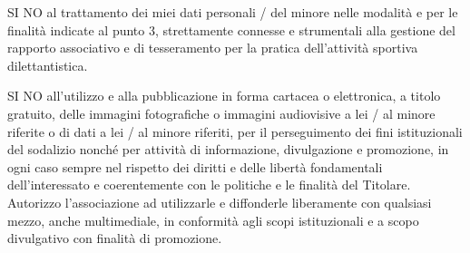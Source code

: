 \documentclass{djtsmod}
\begin{document}
	\squarelabel\; SI \quad \squarelabel\; NO \quad al trattamento dei miei dati personali / del minore nelle modalità e per le finalità indicate al punto 3, strettamente connesse e strumentali alla gestione del rapporto associativo e di tesseramento per la pratica dell'attività sportiva dilettantistica.
	
	\squarelabel\; SI \quad \squarelabel\; NO \quad all'utilizzo e alla pubblicazione in forma cartacea o elettronica, a titolo gratuito, delle immagini fotografiche o immagini audiovisive a lei / al minore riferite o di dati a lei / al minore riferiti, per il perseguimento dei fini istituzionali del sodalizio nonché per attività di informazione, divulgazione e promozione, in ogni caso sempre nel rispetto dei diritti e delle libertà fondamentali dell'interessato e coerentemente con le politiche e le finalità del Titolare. Autorizzo l’associazione ad utilizzarle e diffonderle liberamente con qualsiasi mezzo, anche multimediale, in conformità agli scopi istituzionali e a scopo divulgativo con finalità di promozione.
	
\end{document}
